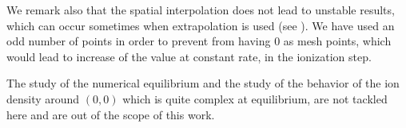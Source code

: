 \documentclass{article}
\numberwithin{equation}{section}
\begin{document}
%
%
%
%

We remark also that the spatial interpolation does not lead to unstable results, which can occur sometimes when extrapolation is used (see \cite{badsiNumericalStabilityPlasma}).
We have used an odd number of points in order to prevent from having  $0$ as mesh points, which would lead to increase of the value at constant rate, in the ionization step.

The study of the numerical equilibrium and the study of the behavior of the ion density around $(0,0)$ which is quite complex at equilibrium, are not tackled here and are out of the scope of this work.
\end{document}
